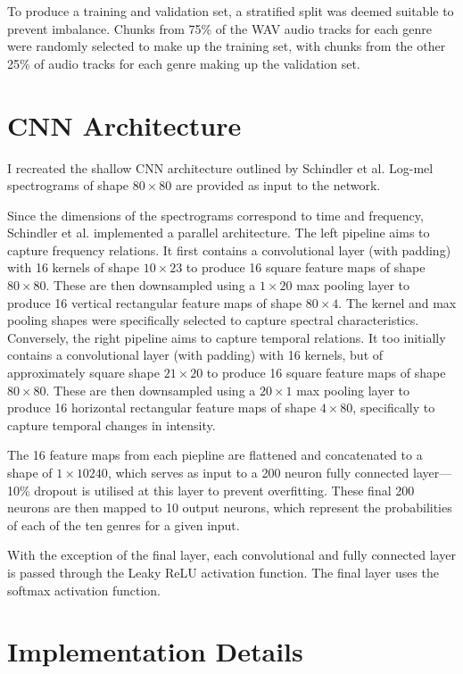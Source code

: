 \documentclass[conference]{IEEEtran}
\begin{document}
To produce a training and validation set, a stratified split was deemed suitable to prevent imbalance.
Chunks from 75\% of the WAV audio tracks for each genre were randomly selected to make up the training set, with chunks from the other 25\% of audio tracks for each genre making up the validation set.

\section{CNN Architecture}

I recreated the shallow CNN architecture outlined by Schindler et al.
Log-mel spectrograms of shape $80\times80$ are provided as input to the network.

Since the dimensions of the spectrograms correspond to time and frequency, Schindler et al. implemented a parallel architecture.
The left pipeline aims to capture frequency relations.
It first contains a convolutional layer (with padding) with 16 kernels of shape $10\times23$ to produce 16 square feature maps of shape $80\times80$.
These are then downsampled using a $1\times20$ max pooling layer to produce 16 vertical rectangular feature maps of shape $80\times4$.
The kernel and max pooling shapes were specifically selected to capture spectral characteristics.
Conversely, the right pipeline aims to capture temporal relations.
It too initially contains a convolutional layer (with padding) with 16 kernels, but of approximately square shape $21\times20$ to produce 16 square feature maps of shape $80\times80$.
These are then downsampled using a $20\times1$ max pooling layer to produce 16 horizontal rectangular feature maps of shape $4\times80$, specifically to capture temporal changes in intensity.

The 16 feature maps from each piepline are flattened and concatenated to a shape of $1\times10240$, which serves as input to a 200 neuron fully connected layer---10\% dropout is utilised at this layer to prevent overfitting.
These final 200 neurons are then mapped to 10 output neurons, which represent the probabilities of each of the ten genres for a given input.

With the exception of the final layer, each convolutional and fully connected layer is passed through the Leaky ReLU activation function.
The final layer uses the softmax activation function.

\section{Implementation Details}
\end{document}
